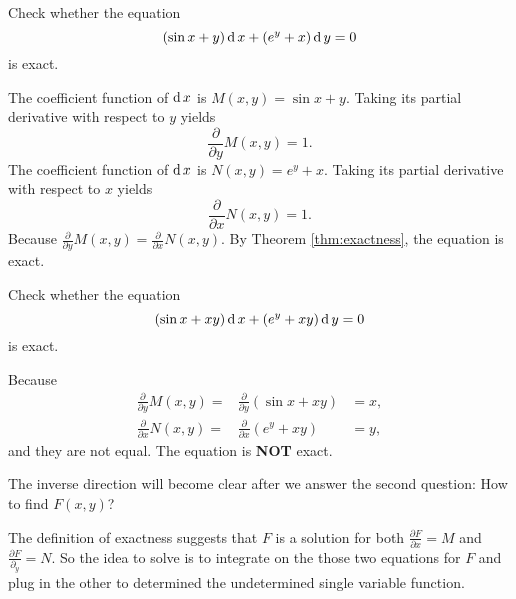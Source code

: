 
\begin{example}
	Check whether the equation 
	\[(\sin x +y)\operatorname{d} x + ( e^y +x)\operatorname{d} y=0\]
	is exact.
\end{example}
\begin{solution}
  The coefficient function of $\operatorname{d} x$ is $M(x,y)=\sin x+ y$. Taking its partial derivative with respect to $y$ yields
  \[\frac{\partial}{\partial y} M(x,y)=1.\]
  The coefficient function of $\operatorname{d} x$ is $N(x,y)= e^y+x$. Taking its partial derivative with respect to $x$ yields
  \[\frac{\partial}{\partial x} N(x,y)=1.\]
  Because $\frac{\partial}{\partial y} M(x,y)=\frac{\partial}{\partial x} N(x,y)$. By Theorem \ref{thm:exactness}, the equation is exact.
\end{solution}

\begin{exercise}
	Check whether the equation 
	\[ ( \sin x +xy)\operatorname{d} x + ( e^y +xy)\operatorname{d} y=0 \]
	is exact.
\end{exercise}
\begin{exersol}
Because  
	\[
	\begin{aligned}
    \frac{\partial}{\partial y} M(x, y)=&\frac{\partial}{\partial y} (\sin x+ xy)&= x,\\
	\frac{\partial}{\partial x} N(x, y)=&\frac{\partial}{\partial x} (e^y+xy)&= y,
	\end{aligned}
	\]
	and they are not equal. The equation is \textbf{NOT} exact.
\end{exersol}

The inverse direction will become clear after we answer the second question: How to find $F(x, y)$?

The definition of exactness suggests that $F$ is a solution for both $\frac{\partial F}{\partial x} = M$ and $\frac{\partial F}{\partial_y} =N$. So the idea to solve is to integrate on the those two equations for $F$ and plug in the other to determined the undetermined single variable function.

